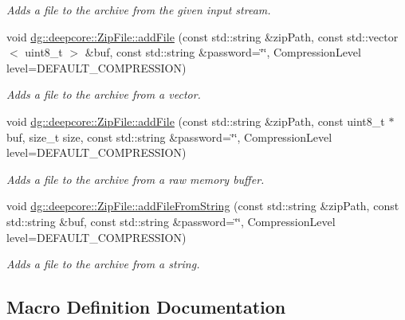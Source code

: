 \begin{DoxyCompactItemize}
\begin{DoxyCompactList}\small\item\em Adds a file to the archive from the given input stream. \end{DoxyCompactList}\item 
void \hyperlink{group___utility_module_gafb1c01f849fc0fc4b33e33285cd39cf5}{dg\+::deepcore\+::\+Zip\+File\+::add\+File} (const std\+::string \&zip\+Path, const std\+::vector$<$ uint8\+\_\+t $>$ \&buf, const std\+::string \&password=\char`\"{}\char`\"{}, Compression\+Level level=D\+E\+F\+A\+U\+L\+T\+\_\+\+C\+O\+M\+P\+R\+E\+S\+S\+I\+ON)
\begin{DoxyCompactList}\small\item\em Adds a file to the archive from a vector. \end{DoxyCompactList}\item 
void \hyperlink{group___utility_module_gaffadeb76614f94276dc5631a7f2f3a7a}{dg\+::deepcore\+::\+Zip\+File\+::add\+File} (const std\+::string \&zip\+Path, const uint8\+\_\+t $\ast$buf, size\+\_\+t size, const std\+::string \&password=\char`\"{}\char`\"{}, Compression\+Level level=D\+E\+F\+A\+U\+L\+T\+\_\+\+C\+O\+M\+P\+R\+E\+S\+S\+I\+ON)
\begin{DoxyCompactList}\small\item\em Adds a file to the archive from a raw memory buffer. \end{DoxyCompactList}\item 
void \hyperlink{group___utility_module_gad85b99f9708af55dfb3074e9a0a50cf3}{dg\+::deepcore\+::\+Zip\+File\+::add\+File\+From\+String} (const std\+::string \&zip\+Path, const std\+::string \&buf, const std\+::string \&password=\char`\"{}\char`\"{}, Compression\+Level level=D\+E\+F\+A\+U\+L\+T\+\_\+\+C\+O\+M\+P\+R\+E\+S\+S\+I\+ON)
\begin{DoxyCompactList}\small\item\em Adds a file to the archive from a string. \end{DoxyCompactList}\end{DoxyCompactItemize}


\subsection{Macro Definition Documentation}
